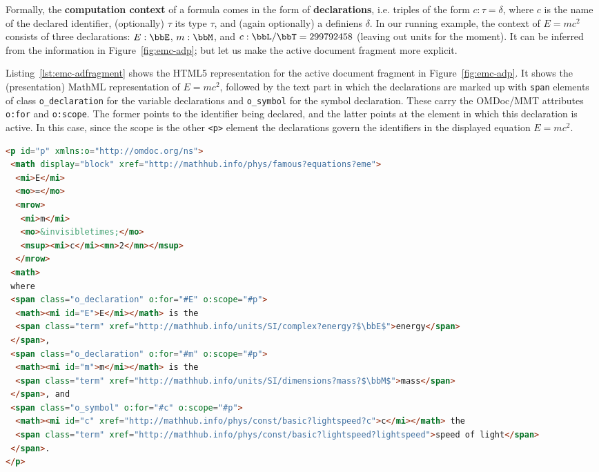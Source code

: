 Formally, the \textbf{computation context} of a formula comes in the form of
\textbf{declarations}, i.e. triples of the form $c:\tau=\delta$, where $c$ is the name of
the declared identifier, (optionally) $\tau$ its type $\tau$, and (again optionally) a
definiens $\delta$. In our running example, the context of $E=mc^2$ consists of three
declarations: $E:\bbE$, $m:\bbM$, and $c:\bbL/\bbT=299 792 458$ (leaving out units for the
moment). It can be inferred from the information in Figure~\ref{fig:emc-adp}; but let us
make the active document fragment more explicit. 

Listing~\ref{lst:emc-adfragment} shows the HTML5 representation for the active
document fragment in Figure~\ref{fig:emc-adp}. It shows the (presentation) MathML
representation of $E=mc^2$, followed by the text part in which the declarations are marked
up with \lstinline|span| elements of class \lstinline|o_declaration| for the variable
declarations and \lstinline|o_symbol| for the symbol declaration. These carry the
OMDoc/MMT attributes \lstinline|o:for| and \lstinline|o:scope|. The former points to the
identifier being declared, and the latter points at the element in which this declaration
is active. In this case, since the scope is the other \lstinline|<p>| element the
declarations govern the identifiers in the displayed equation $E=mc^2$. 

\begin{lstlisting}[label=lst:emc-adfragment,caption=Native Markup for an Active Document Fragment, 
language=HTML,basicstyle=\footnotesize\sf,mathescape,morekeywords={mi,mo,msup,math,mrow}]
<p id="p" xmlns:o="http://omdoc.org/ns">
 <math display="block" xref="http://mathhub.info/phys/famous?equations?eme">
  <mi>E</mi>
  <mo>=</mo>
  <mrow>
   <mi>m</mi>
   <mo>&invisibletimes;</mo>
   <msup><mi>c</mi><mn>2</mn></msup>
  </mrow>
 <math>
 where 
 <span class="o_declaration" o:for="#E" o:scope="#p">
  <math><mi id="E">E</mi></math> is the 
  <span class="term" xref="http://mathhub.info/units/SI/complex?energy?$\bbE$">energy</span>
 </span>,
 <span class="o_declaration" o:for="#m" o:scope="#p">
  <math><mi id="m">m</mi></math> is the 
  <span class="term" xref="http://mathhub.info/units/SI/dimensions?mass?$\bbM$">mass</span>
 </span>, and 
 <span class="o_symbol" o:for="#c" o:scope="#p">
  <math><mi id="c" xref="http://mathhub.info/phys/const/basic?lightspeed?c">c</mi></math> the 
  <span class="term" xref="http://mathhub.info/phys/const/basic?lightspeed?lightspeed">speed of light</span>
 </span>.
</p>
\end{lstlisting}

